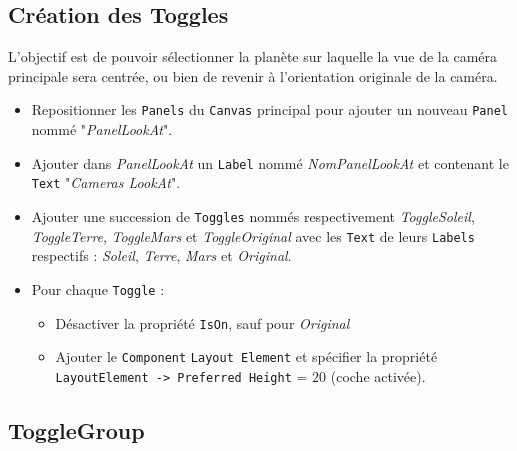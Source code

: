 \documentclass[a4paper,10pt]{article}
\newenvironment{solution}%
{\begin{tcolorbox}[breakable,colback=red!5!white,colframe=red!75!black,title=Solution]}%
{\end{tcolorbox}}
\begin{document}
\ifversionenseignant
\begin{solution}

\subsection{Création des Toggles}

L'objectif est de pouvoir sélectionner la planète sur laquelle la vue de la caméra principale sera centrée, ou bien de revenir à l'orientation originale de la caméra.

\begin{itemize}
	\item Repositionner les \texttt{Panels} du \texttt{Canvas} principal pour ajouter un nouveau \texttt{Panel} nommé "\textit{PanelLookAt}".
	\item Ajouter dans  \textit{PanelLookAt} un \texttt{Label} nommé \textit{NomPanelLookAt} et contenant le \texttt{Text} "\textit{Cameras LookAt}".
	\item Ajouter une succession de \texttt{Toggles} nommés respectivement \textit{ToggleSoleil}, \textit{ToggleTerre}, \textit{ToggleMars} et \textit{ToggleOriginal} avec les \texttt{Text} de leurs \texttt{Labels} respectifs : \textit{Soleil}, \textit{Terre}, \textit{Mars} et \textit{Original}.
	\item Pour chaque \texttt{Toggle} :
	\begin{itemize}
		\item 	Désactiver la propriété \texttt{IsOn}, sauf pour \textit{Original}
		\item  Ajouter le \texttt{Component} \texttt{Layout Element} et spécifier la propriété \texttt{LayoutElement -> Preferred Height} = $20$ (coche activée).		
	\end{itemize}	
\end{itemize}

\subsection{ToggleGroup}


\end{solution}
\end{document}
